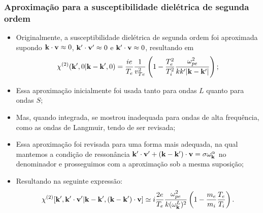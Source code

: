 \documentclass[10pt,aspectratio=1610,lualatex]{beamer}
\begin{document}
\begin{frame}[noframenumbering]
   \frametitle{Aproximação para a susceptibilidade dielétrica de segunda
    ordem}
  \begin{itemize}
    \item Originalmente, a susceptibilidade dielétrica de segunda
    ordem foi aproximada supondo ${\bf k \cdot v}\approx 0$,
    ${\bf k'\cdot v'}\approx 0$ e ${\bf k' \cdot v}\approx 0$,
    resultando em
    \begin{equation*}
      \chi^{(2)}({\bf k}',0|{\bf k}-{\bf k}',0)
      =\frac{i e}{T_e}\frac{1}{v_{Te}^2}\left( 1-\frac{T_e^2}{T_i^2}
      \frac{\omega_{pe}^2}{k k' |{\bf k-k'}|}\right);
    \end{equation*}
  \item Essa aproximação inicialmente foi usada tanto para ondas
    $L$ quanto para ondas $S$;
  \item Mas, quando integrada, se mostrou inadequada para ondas
    de alta frequência, como as ondas de Langmuir, tendo de ser
    revisada;
    \pause
    \item Essa aproximação foi revisada para uma forma mais adequada,
    na qual mantemos a condição de ressonância
    ${\bf k'\cdot v'}+({\bf k-k'})\cdot{\bf v}=\sigma\omega_{\bf k}^\alpha$
    no denominador e prosseguimos com a aproximação sob a mesma suposição;
    \pause
    \vspace{0.1cm}
  \item  Resultando na seguinte expressão:
    \begin{equation*}
      \chi^{(2)}[{\bf k'},{\bf k'\cdot v'}|{\bf k-k'},({\bf k-k'})\cdot{\bf v}]
      \simeq i\frac{2e}{T_e}\frac{\omega_{pe}^2}{k(\omega_{\bf k}^L)^2}
      \left(1-\frac{m_e}{m_i}\frac{T_e}{T_i}\right).
    \end{equation*}
  \end{itemize}
\end{frame}
\end{document}
